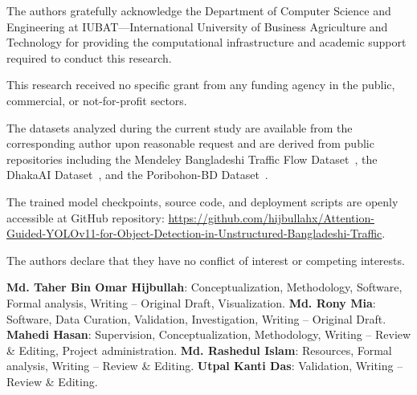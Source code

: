 \documentclass[pdflatex,sn-mathphys]{sn-jnl}
\begin{document}
The authors gratefully acknowledge the Department of Computer Science and Engineering at IUBAT---International University of Business Agriculture and Technology for providing the computational infrastructure and academic support required to conduct this research.

This research received no specific grant from any funding agency in the public, commercial, or not-for-profit sectors.

The datasets analyzed during the current study are available from the corresponding author upon reasonable request and are derived from public repositories including the Mendeley Bangladeshi Traffic Flow Dataset~\cite{islam2025bangladeshi}, the DhakaAI Dataset~\cite{shihavuddin2020dhakaai}, and the Poribohon-BD Dataset~\cite{sujoy2024monocular}.

The trained model checkpoints, source code, and deployment scripts are openly accessible at GitHub repository: \url{https://github.com/hijbullahx/Attention-Guided-YOLOv11-for-Object-Detection-in-Unstructured-Bangladeshi-Traffic}.

The authors declare that they have no conflict of interest or competing interests.

\textbf{Md. Taher Bin Omar Hijbullah}: Conceptualization, Methodology, Software, Formal analysis, Writing -- Original Draft, Visualization. 
\textbf{Md. Rony Mia}: Software, Data Curation, Validation, Investigation, Writing -- Original Draft. 
\textbf{Mahedi Hasan}: Supervision, Conceptualization, Methodology, Writing -- Review \& Editing, Project administration. 
\textbf{Md. Rashedul Islam}: Resources, Formal analysis, Writing -- Review \& Editing. 
\textbf{Utpal Kanti Das}: Validation, Writing -- Review \& Editing.


\end{document}
